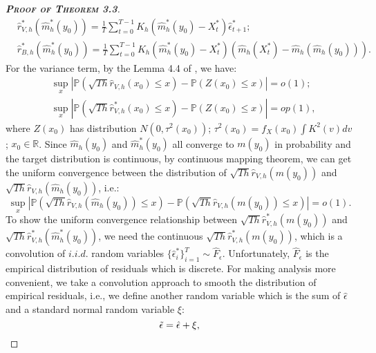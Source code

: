 \documentclass[a4paper]{article}
\begin{document}
\begin{proof}[\textbf{\textsc{Proof of Theorem 3.3}}]
\begin{equation}
\begin{split}
    &\hat{r}^*_{V,h}(\widehat{m}^*_{h}(y_0)) = \frac{1}{T}\sum_{t=0}^{T-1}K_h(\widehat{m}^*_h(y_0)-X^*_t)\hat{\epsilon}^*_{t+1};\\
    &\hat{r}^*_{B,h}(\widehat{m}^*_{h}(y_0)) =  \frac{1}{T}\sum_{t=0}^{T-1}K_h(\widehat{m}^*_h(y_0)-X^*_t)\left(\widehat{m}_h(X^*_t) -  \widehat{m}_h(\widehat{m}_h(y_0))    \right).
\end{split}
\end{equation}
For the variance term, by the Lemma 4.4 of \cite{franke2002bootstrap}, we have:
\begin{equation}\label{varpart}
\begin{split}
    &\sup_{x}\left|\mathbb{P}(\sqrt{Th}\hat{r}_{V,h}(x_0) \leq x) - \mathbb{P}(Z(x_0)\leq x)     \right| = o(1);\\
    & \sup_{x}\left|\mathbb{P}(\sqrt{Th}\hat{r}^*_{V,h}(x_0) \leq x) - \mathbb{P}(Z(x_0)\leq x)     \right| = op(1),
\end{split}
\end{equation}
where $Z(x_0)$ has distribution $N(0,\tau^2(x_0))$; $\tau^2(x_0) = f_{X}(x_0)\int K^2(v)dv$; $x_0\in \mathbb{R}$. Since $\widehat{m}_{h}(y_0)$ and $\widehat{m}^*_{h}(y_0)$ all converge to $m(y_0)$ in probability and the target distribution is continuous, by continuous mapping theorem, we can get the uniform convergence between the distribution of $\sqrt{Th}\hat{r}_{V,h}(m(y_0))$ and $\sqrt{Th}\hat{r}_{V,h}(\widehat{m}_{h}(y_0))$, i.e.:
\begin{equation}\label{unifconvarpart1}
    \sup_{x}\left|\mathbb{P}(\sqrt{Th}\hat{r}_{V,h}(\widehat{m}_h(y_0)) \leq x) - \mathbb{P}(\sqrt{Th}\hat{r}_{V,h}(m(y_0))\leq x)     \right| = o(1).
\end{equation}
To show the uniform convergence relationship between $\sqrt{Th}\hat{r}^*_{V,h}(m(y_0))$ and $\sqrt{Th}\hat{r}^*_{V,h}(\widehat{m}^*_{h}(y_0))$, we need the continuous $\sqrt{Th}\hat{r}^*_{V,h}(m(y_0))$, which is a convolution of $i.i.d.$ random variables $\{\hat{\epsilon}^*_{i}\}_{i = 1}^{T}\sim \widehat{F}_{\epsilon}$. Unfortunately, $\widehat{F}_{\epsilon}$ is the empirical distribution of residuals which is discrete. For making analysis more convenient, we take a convolution approach to smooth the distribution of empirical residuals, i.e., we define another random variable which is the sum of $\hat{\epsilon}$ and a standard normal random variable $\xi$:
\begin{equation}
    \Tilde{\epsilon} = \hat{\epsilon} + \xi,
\end{equation}

\end{proof}
\end{document}

